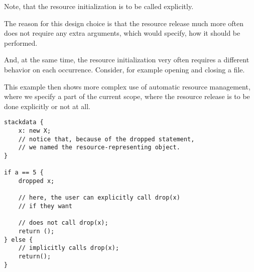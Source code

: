 \begin{remark}
    Note, that the resource initialization is to be called explicitly.

    The reason for this design choice is that the resource release much more often does not require any extra arguments, which would specify, how it should be performed.

    And, at the same time, the resource initialization very often requires a different behavior on each occurrence. Consider, for example opening and closing a file.
\end{remark}

\begin{ex}
    This example then shows more complex use of automatic resource management, where we specify a part of the current scope, where the resource release is to be done explicitly or not at all.

    \begin{lstlisting}
stackdata {
    x: new X;
    // notice that, because of the dropped statement,
    // we named the resource-representing object.
}

if a == 5 {
    dropped x;

    // here, the user can explicitly call drop(x)
    // if they want

    // does not call drop(x);
    return ();
} else {
    // implicitly calls drop(x);
    return();
}
    \end{lstlisting}
\end{ex}

